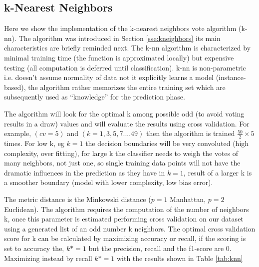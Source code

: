 \documentclass[11pt]{article}
\theoremstyle{definition}
\theoremstyle{remark}
\begin{document}
\subsection{k-Nearest Neighbors}
\label{se:reskneighbors}

Here we show the implementation of the k-nearest neighbors vote algorithm (k-nn). The algorithm was introduced in Section \ref{sse:kneighbors} its main characteristics are briefly reminded next.
The k-nn algorithm is characterized by minimal training time (the function is approximated locally) but expensive testing (all computation is deferred until classification). k-nn is non-parametric i.e. doesn't assume normality of data not it explicitly learns a model (instance-based), the algorithm rather memorizes the entire training set which are subsequently used as “knowledge” for the prediction phase.

The algorithm will look for the optimal k among possible odd (to avoid voting results in a draw) values and will evaluate the results using cross validation. For example, $(cv=5)$ and $(k=1,3,5,7....49)$ then the algorithm is trained $\frac{50}{2} \times 5$ times. 
For low k, eg $k=1$ the decision boundaries will be very convoluted (high complexity, over fitting), for large k the classifier needs to weigh the votes of many neighbors, not just one, so single training data points will not have the dramatic influences in the prediction as they have in $k=1$, result of a larger k is a smoother boundary (model with lower complexity, low bias error).

The metric distance is the Minkowski distance ($p=1$ Manhattan, $p=2$ Euclidean).
The algorithm requires the computation of the number of neighbors k, once this parameter is estimated performing cross validation on our dataset using a generated list of an odd number k neighbors. The optimal cross validation score for k can be calculated by maximizing accuracy or recall, if the scoring is set to accuracy the, $k*=1$ but the precision, recall and the f1-score are 0. Maximizing instead by recall $k*=1$ with the results shown in Table \ref{tab:knn} 
\end{document}
